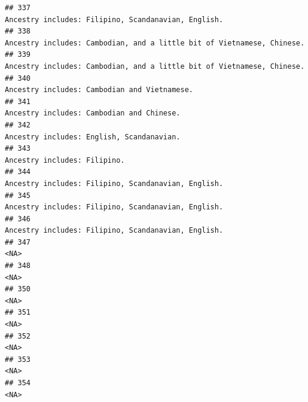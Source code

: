 \documentclass[]{article}
\begin{document}
\begin{verbatim}
## 337                                                                                                 Ancestry includes: Filipino, Scandanavian, English.
## 338                                                                              Ancestry includes: Cambodian, and a little bit of Vietnamese, Chinese.
## 339                                                                              Ancestry includes: Cambodian, and a little bit of Vietnamese, Chinese.
## 340                                                                                                        Ancestry includes: Cambodian and Vietnamese.
## 341                                                                                                           Ancestry includes: Cambodian and Chinese.
## 342                                                                                                           Ancestry includes: English, Scandanavian.
## 343                                                                                                                        Ancestry includes: Filipino.
## 344                                                                                                 Ancestry includes: Filipino, Scandanavian, English.
## 345                                                                                                 Ancestry includes: Filipino, Scandanavian, English.
## 346                                                                                                 Ancestry includes: Filipino, Scandanavian, English.
## 347                                                                                                                                                <NA>
## 348                                                                                                                                                <NA>
## 350                                                                                                                                                <NA>
## 351                                                                                                                                                <NA>
## 352                                                                                                                                                <NA>
## 353                                                                                                                                                <NA>
## 354                                                                                                                                                <NA>

\end{verbatim}
\end{document}
